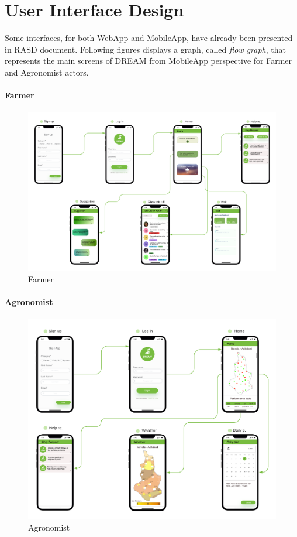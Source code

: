 \chapter{User Interface Design}
Some interfaces, for both WebApp and MobileApp, have already been presented in RASD document.\newline
Following figures displays a graph, called \textit{flow graph}, that represents the main screens of DREAM from MobileApp perspective for Farmer and Agronomist actors.


\subsubsection{Farmer}

\begin{figure}[H]
   \centering
  \centerline{\includegraphics[width=150mm,scale=0.9]{./Images//Mocks/Mobile_farmer/Blank diagram.png}}
  \caption{Farmer}
\end{figure}


\subsubsection{Agronomist}

\begin{figure}[H]
   \centering
  \centerline{\includegraphics[width=150mm,scale=0.9]{./Images//Mocks/Mobile_agronomist/Agronomist.png}}
  \caption{Agronomist}
\end{figure}